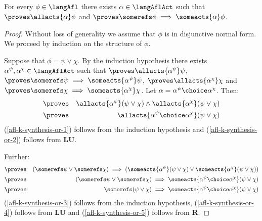 \documentclass[twoside]{aiml14}
\begin{document}
  \subsection{\classK{}}

  \begin{proposition}\label{afl-k-synthesis}
      For every $\phi \in \langAfl$ there exists $\alpha \in \langAflAct$ such that $\proves \allacts{\alpha} \phi$ and $\proves \somerefs \phi \implies \someacts{\alpha} \phi$.
  \end{proposition}

  \begin{proof}
      Without loss of generality we assume that $\phi$ is in disjunctive normal
      form. We proceed by induction on the structure of $\phi$.

      Suppose that $\phi = \psi \lor \chi$. By the induction hypothesis 
      there exists $\alpha^\psi, \alpha^\chi \in \langAflAct$ 
      such that $\proves \allacts{\alpha^\psi} \psi$, 
      $\proves \somerefs \psi \implies \someacts{\alpha^\psi} \psi$,
      $\proves \allacts{\alpha^\chi} \chi$ and
      $\proves \somerefs \chi \implies \someacts{\alpha^\chi} \chi$.
      Let $\alpha = \alpha^\psi \choice \alpha^\chi$.
      Then:
      \begin{eqnarray}
          &\proves& \allacts{\alpha^\psi} (\psi \lor \chi) \land \allacts{\alpha^\chi} (\psi \lor \chi)\label{afl-k-synthesis-or-1}\\
          &\proves& \allacts{\alpha^\psi \choice \alpha^\chi} (\psi \lor \chi)\label{afl-k-synthesis-or-2}
      \end{eqnarray}
      (\ref{afl-k-synthesis-or-1}) follows from the induction hypothesis and
      (\ref{afl-k-synthesis-or-2}) follows from {\bf LU}.

      Further:
      \begin{eqnarray}
          &\proves& (\somerefs \psi \lor \somerefs \chi) \implies (\someacts{\alpha^\psi} (\psi \lor \chi) \lor \someacts{\alpha^\chi} (\psi \lor \chi))\label{afl-k-synthesis-or-3}\\
          &\proves& (\somerefs \psi \lor \somerefs \chi) \implies \someacts{\alpha^\psi \choice \alpha^\chi} (\psi \lor \chi)\label{afl-k-synthesis-or-4}\\
          &\proves& \somerefs (\psi \lor \chi) \implies \someacts{\alpha^\psi \choice \alpha^\chi} (\psi \lor \chi)\label{afl-k-synthesis-or-5}
      \end{eqnarray}
      (\ref{afl-k-synthesis-or-3}) follows from the induction hypothesis,
      (\ref{afl-k-synthesis-or-4}) follows from {\bf LU} and
      (\ref{afl-k-synthesis-or-5}) follows from {\bf R}.


\end{proof}
\end{document}
